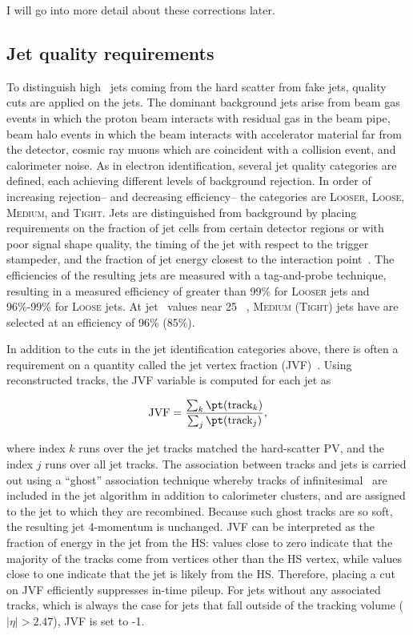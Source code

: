 \noindent
I will go into more detail about these corrections later.

\subsection{Jet quality requirements}
\label{chap:reco:sec:jet:subsec:quality}

To distinguish high \pt~jets coming from the hard scatter from fake
jets, quality cuts are applied on the jets. The dominant background
jets arise from beam gas events in which the proton beam interacts
with residual gas in the beam pipe, beam halo events in which the beam
interacts with accelerator material far from the detector, cosmic ray
muons which are coincident with a collision event, and calorimeter
noise. As in electron identification, several jet quality categories
are defined, each achieving different levels of background
rejection. In order of increasing rejection-- and decreasing
efficiency-- the categories are L\textsc{ooser}, L\textsc{oose},
M\textsc{edium}, and T\textsc{ight}. Jets are distinguished from
background by placing requirements on the fraction of jet cells from
certain detector regions or with poor signal shape quality, the timing
of the jet with respect to the trigger stampeder, and the fraction of
jet energy closest to the interaction point~\cite{bib:Aad:2011he}. The
efficiencies of the resulting jets are measured with a tag-and-probe
technique, resulting in a measured efficiency of greater than 99\% for
L\textsc{ooser} jets and 96\%-99\% for L\textsc{oose} jets. At
jet \pt~values near 25 \gev~, M\textsc{edium} (T\textsc{ight}) jets
have are selected at an efficiency of 96\% (85\%). 

In addition to the cuts in the jet identification categories above,
there is often a requirement on a quantity called the jet vertex
fraction (JVF)~\cite{bib:ATLAS-CONF-2013-083}. Using reconstructed
tracks, the JVF variable is computed for each jet as

\begin{equation}
\textrm{JVF} = \frac{\sum_k \pt(\textrm{track}_k)}{\sum_j \pt(\textrm{track}_j)},
\end{equation}

\noindent
where index $k$ runs over the jet tracks matched the hard-scatter PV,
and the index $j$ runs over all jet tracks. The association between
tracks and jets is carried out using a ``ghost'' association technique
whereby tracks of infinitesimal \pt~are included in the jet algorithm
in addition to calorimeter clusters, and are assigned to the jet to
which they are recombined. Because such ghost tracks are so soft, the
resulting jet 4-momentum is unchanged. JVF can be interpreted as the
fraction of energy in the jet from the HS: values close to zero
indicate that the majority of the tracks come from vertices other than
the HS vertex, while values close to one indicate that the jet is
likely from the HS. Therefore, placing a cut on JVF efficiently
suppresses in-time pileup. For jets without any associated tracks,
which is always the case for jets that fall outside of the tracking
volume ($|\eta| > 2.47$), JVF is set to -1. 

